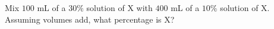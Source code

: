 Mix $100$ mL of a $30\%$ solution of X with $400$ mL of a $10\%$ solution of X. Assuming volumes add, what percentage is X?
